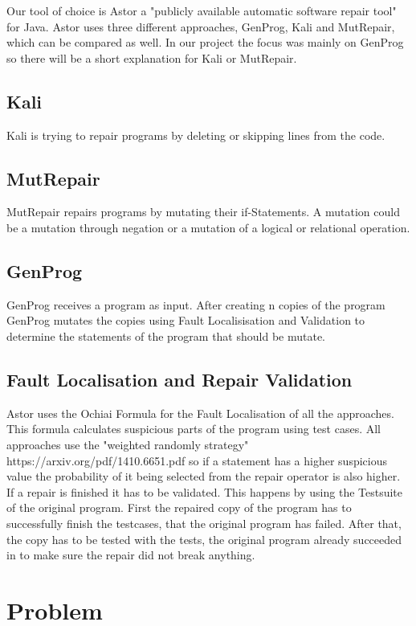 \documentclass[pdftex,english,oribibl]{llncs}
\begin{document}
Our tool of choice is Astor a "publicly available automatic software repair tool"  for Java. Astor uses three different approaches, GenProg, Kali and MutRepair, which can be compared as well. In our project the focus was mainly on GenProg so there will be a short explanation for Kali or MutRepair.\\
\subsection{Kali}
Kali is trying to repair programs by deleting or skipping lines from the code.
\subsection{MutRepair}
MutRepair repairs programs by mutating their if-Statements. A mutation could be a mutation through negation or a mutation of a logical or relational operation.
\subsection{GenProg}
GenProg receives a program as input. After creating n copies of the program GenProg mutates the copies using Fault Localisisation and Validation to determine the statements of the program that should be mutate.
\subsection{Fault Localisation and Repair Validation}
Astor uses the Ochiai Formula for the Fault Localisation of all the approaches. This formula calculates suspicious parts of the program using test cases. All approaches use the "weighted randomly strategy" https://arxiv.org/pdf/1410.6651.pdf so if a statement has a higher suspicious value the probability of it being selected from the repair operator is also higher.\\
If a repair is finished it has to be validated. This happens by using the Testsuite of the original program. First the repaired copy of the program has to successfully finish the testcases, that the original program has failed. After that, the copy has to be tested with the tests, the original program already succeeded in to make sure the repair did not break anything.

 \cite{salam}

\section{Problem}\label{sec:problem}
\end{document}

